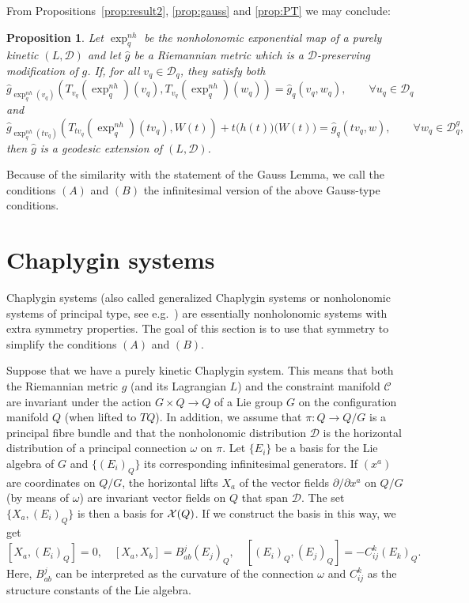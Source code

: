 \documentclass[11pt]{article}
\newtheorem{prop}{Proposition}
\def\vectorfields#1{{\cal X}(#1)}
\def\D{{\mathcal D}}
\def\C{{\mathcal C}}
\begin{document}
From Propositions~\ref{prop:result2}, \ref{prop:gauss} and \ref{prop:PT}  we may conclude:
\begin{prop}  Let $\exp_q^{nh}$ be the nonholonomic exponential map of a purely kinetic $(L,\D)$ and let $\hat{g}$ be a Riemannian metric which is a $\D$-preserving modification of $g$.  If, for all $v_q\in\D_q$, they  satisfy both 
$$
\hat{g}_{\exp^{nh}_q(v_q)}\left(T_{v_q}\left(\exp _q^{nh}\right)\left(v_{q}\right), T_{v_q}\left(\exp _q^{nh}\right)\left(w_{q}\right)\right)=\hat{g}_q(v_{q},w_{q}), \qquad \forall u_q \in \D_q 
$$
and   
$$ 
\hat{g}_{\exp_q^{nh}(tv_q)}\left(T_{tv_q}(\exp^{nh}_q)(tv_q),W(t)\right)+t \Big(h(t)\Big)\Big(W(t)\Big)=\hat{g}_q(tv_q,w), \qquad \forall w_q\in\D^g_q,
$$
 then ${\hat g}$ is a geodesic extension of $(L,\D)$.
\end{prop}
Because of the similarity with the statement of the Gauss Lemma, we call the conditions $(A)$ and $(B)$ the infinitesimal version of the above Gauss-type conditions.

\section{Chaplygin systems} \label{sec7}

Chaplygin systems (also called generalized Chaplygin systems or nonholonomic systems of {principal} type, see e.g.\ \cite{Bloch,Frans,LuisJC}) are essentially nonholonomic systems with extra symmetry properties. The goal of this section is to use that symmetry to simplify the conditions $(A)$ and $(B)$. 

Suppose that we have a purely kinetic Chaplygin system. This means that both the Riemannian metric $g$ (and its Lagrangian $L$) and the constraint manifold $\C$ are invariant under the action $G\times Q \to Q$ of a Lie group $G$ on the configuration manifold $Q$ (when lifted to $TQ$). In addition, we  assume that $\pi: Q\to Q/G$ is a principal fibre bundle and that the nonholonomic distribution $\mathcal{D}$ is  the horizontal distribution of a principal connection $\omega$ on $\pi$. Let $\{E_i\}$ be a basis for the Lie algebra of $G$ and $\{(E_i)_Q\}$ its corresponding infinitesimal generators. If $(x^a)$ are coordinates on $Q/G$, the horizontal lifts $X_a$ of the vector fields $\partial/\partial x^a$ on $Q/G$ (by means of $\omega$) are invariant vector fields on $Q$ that span $\D$. 
 The set $\{X_a,(E_i)_Q\}$ is then a basis for $\vectorfields{Q}$.
If we construct the basis in this way, we get
$$
[X_a, (E_i)_Q]=0,\quad[X_a, X_b]=B_{a b}^j (E_j)_Q,\quad[(E_i)_Q, (E_j)_Q]=-C_{i j}^k (E_k)_Q.
$$
Here, $B_{a b}^j$ can be interpreted as the curvature of the connection $\omega$ and $C_{i j}^k$ as the structure constants of the Lie algebra.
\end{document}
